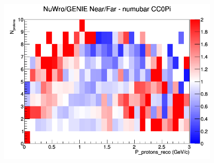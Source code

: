 \documentclass[12pt]{article}
\begin{document}
\begin{figure}[h]
\endminipage
{}
\includegraphics[width=\linewidth]{eff_N_P/FGT/protons/ratios/CC0Pi_NuWro_GENIE_numubar_NF_N_P.png}
\endminipage
\newline
\end{figure}
\clearpage
\end{document}
